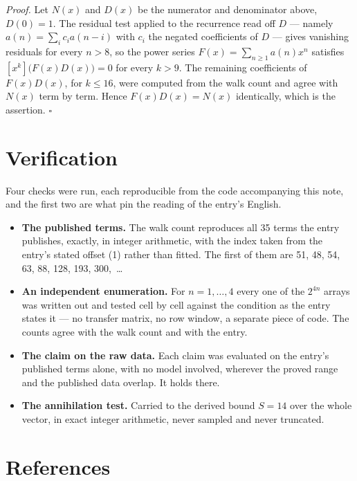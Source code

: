 \documentclass[11pt]{article}
\theoremstyle{definition}
\begin{document}
{\itshape Proof.} Let $N(x)$ and $D(x)$ be the numerator and denominator above, $D(0)=1$. The residual test applied to the recurrence read off $D$ --- namely $a(n) = \sum_i c_i a(n-i)$ with $c_i$ the negated coefficients of $D$ --- gives vanishing residuals for every $n > 8$, so the power series $F(x)=\sum_{n\ge 1}a(n)x^n$ satisfies $[x^k]\bigl(F(x)D(x)\bigr) = 0$ for every $k > 9$. The remaining coefficients of $F(x)D(x)$, for $k \le 16$, were computed from the walk count and agree with $N(x)$ term by term. Hence $F(x)D(x) = N(x)$ identically, which is the assertion. $\square$

\section{Verification}

Four checks were run, each reproducible from the code accompanying this note, and the first two are what pin the reading of the entry's English.

\begin{itemize}

\item {\bfseries The published terms.} The walk count reproduces all 35 terms the entry publishes, exactly, in integer arithmetic, with the index taken from the entry's stated offset (1) rather than fitted. The first of them are 51, 48, 54, 63, 88, 128, 193, 300,~\dots

\item {\bfseries An independent enumeration.} For $n = 1,\dots,4$ every one of the $2^{4n}$ arrays was written out and tested cell by cell against the condition as the entry states it --- no transfer matrix, no row window, a separate piece of code. The counts agree with the walk count and with the entry.

\item {\bfseries The claim on the raw data.} Each claim was evaluated on the entry's published terms alone, with no model involved, wherever the proved range and the published data overlap. It holds there.

\item {\bfseries The annihilation test.} Carried to the derived bound $S = 14$ over the whole vector, in exact integer arithmetic, never sampled and never truncated.

\end{itemize}

\section{References}
\end{document}
